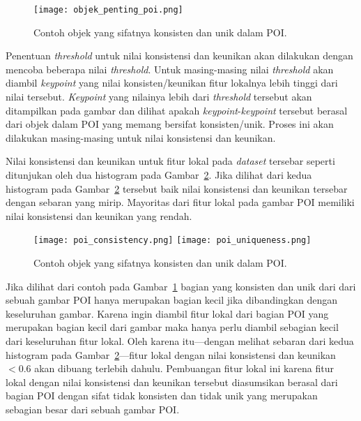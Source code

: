 \begin{figure}[H]
	\centering
	\texttt{[image: objek\_penting\_poi.png]}
	\caption{Contoh objek yang sifatnya konsisten dan unik dalam POI.}
	\label{fig:objek_penting_poi}
\end{figure}

Penentuan \textit{threshold} untuk nilai konsistensi dan keunikan akan dilakukan dengan mencoba beberapa nilai \textit{threshold}. Untuk masing-masing nilai \textit{threshold} akan diambil \textit{keypoint} yang nilai konsisten/keunikan fitur lokalnya lebih tinggi dari nilai tersebut. \textit{Keypoint} yang nilainya lebih dari \textit{threshold} tersebut akan ditampilkan pada gambar dan dilihat apakah \textit{keypoint}-\textit{keypoint} tersebut berasal dari objek dalam POI yang memang bersifat konsisten/unik. Proses ini akan dilakukan masing-masing untuk nilai konsistensi dan keunikan.

Nilai konsistensi dan keunikan untuk fitur lokal pada \textit{dataset} tersebar seperti ditunjukan oleh dua histogram pada Gambar~\ref{fig:poi_consistency_uniqueness}. Jika dilihat dari kedua histogram pada Gambar~\ref{fig:poi_consistency_uniqueness} tersebut baik nilai konsistensi dan keunikan tersebar dengan sebaran yang mirip. Mayoritas dari fitur lokal pada gambar POI memiliki nilai konsistensi dan keunikan yang rendah. 
\begin{figure}[H]
	\centering
	\texttt{[image: poi\_consistency.png]}
	\texttt{[image: poi\_uniqueness.png]}
	\caption{Contoh objek yang sifatnya konsisten dan unik dalam POI.}
	\label{fig:poi_consistency_uniqueness}
\end{figure}
Jika dilihat dari contoh pada Gambar~\ref{fig:objek_penting_poi} bagian yang konsisten dan unik dari dari sebuah gambar POI hanya merupakan bagian kecil jika dibandingkan dengan keseluruhan gambar. Karena ingin diambil fitur lokal dari bagian POI yang merupakan bagian kecil dari gambar maka hanya perlu diambil sebagian kecil dari keseluruhan fitur lokal. Oleh karena itu---dengan melihat sebaran dari kedua histogram pada Gambar~\ref{fig:poi_consistency_uniqueness}---fitur lokal dengan nilai konsistensi dan keunikan $<0.6$ akan dibuang terlebih dahulu. Pembuangan fitur lokal ini karena fitur lokal dengan nilai konsistensi dan keunikan tersebut diasumsikan berasal dari bagian POI dengan sifat tidak konsisten dan tidak unik yang merupakan sebagian besar dari sebuah gambar POI. 

